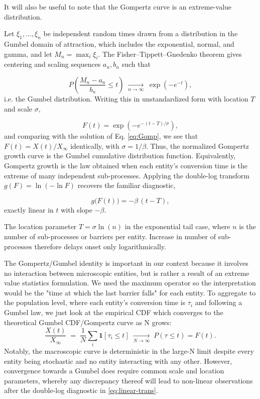 \documentclass{article}
\begin{document}
It will also be useful to note that the Gompertz curve is an extreme-value distribution. 

Let $\xi_1,\dots,\xi_n$ be independent random times drawn from a distribution in the Gumbel domain of attraction, which includes the exponential, normal, and gamma, and let $M_n = \max_i \xi_i$. The Fisher–Tippett–Gnedenko theorem \citep{fisher1928limiting,gnedenko1943distribution} gives centering and scaling sequences $a_n, b_n$ such that

\begin{equation}
P\!\left(\frac{M_n - a_n}{b_n} \le t\right) \;\xrightarrow[n\to\infty]{}\; \exp\!\left(-e^{-t}\right),
\end{equation}
i.e. the Gumbel distribution. Writing this in unstandardized form with location $T$ and scale $\sigma$,

\begin{equation}
\label{eq:gumbel}
F(t) = \exp\!\left(-e^{-(t-T)/\sigma}\right),
\end{equation}
and comparing with the solution of Eq. \ref{eq:Gomp}, we see that $F(t) = X(t)/X_\infty$ identically, with $\sigma = 1/\beta$. Thus, the normalized Gompertz growth curve is the Gumbel cumulative distribution function. Equivalently, Gompertz growth is the law obtained when each entity's conversion time is the extreme of many independent sub-processes. Applying the double-log transform $g(F) = \ln(-\ln F)$ recovers the familiar diagnostic,

\begin{equation}
  g\big(F(t)\big) = -\beta\,(t - T),  
  \label{eq:linear-trans}
\end{equation}  
exactly linear in $t$ with slope $-\beta$.

The location parameter $T=\sigma \ln(n)$ in the exponential tail case, where $n$ is the number of sub-processes or barriers per entity. Increase in number of sub-processes therefore delays onset only logarithmically.
  
The Gompertz/Gumbel identity is important in our context because it involves no interaction between microscopic entities, but is rather a result of an extreme value statistics formulation. We used the maximum operator so the interpretation would be the "time at which the last barrier falls" for each entity. To aggregate to the population level, where each entity's conversion time is $\tau_i$ and following a Gumbel law, we just look at the empirical CDF which converges to the theoretical Gumbel CDF/Gompertz curve as N grows:
\begin{equation}
  \frac{X(t)}{X_\infty} \;=\; \frac{1}{N}\sum_i \mathbf{1}[\tau_i \le t] \;\xrightarrow[N\to\infty]{}\; P(\tau \le t) = F(t).
\end{equation} 
Notably, the macroscopic curve is deterministic in the large-N limit despite every entity being stochastic and no entity interacting with any other. However, convergence towards a Gumbel does require common scale and location parameters, whereby any discrepancy thereof will lead to non-linear observations after the double-log diagnostic in \ref{eq:linear-trans}. 
\end{document}
